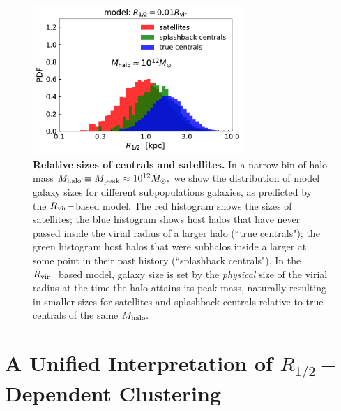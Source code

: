 \documentclass[usenatbib,usegraphicx,letterpaper]{mn2e}
\newcommand{\rhalf}{R_{1/2}}
\newcommand{\mpeak}{M_{\rm peak}}
\newcommand{\mhalo}{M_{\rm halo}}
\newcommand{\rvir}{R_{\rm vir}}
\newcommand{\msun}{M_\odot}
\begin{document}
\begin{figure}
\centering
\includegraphics[width=8cm]{FIGS/rvir_only_cen_sat_sizes.pdf}
\caption{
{\bf Relative sizes of centrals and satellites.}
In a narrow bin of halo mass $\mhalo\equiv\mpeak\approx10^{12}\msun,$ we show the distribution of model galaxy sizes for different subpopulations galaxies, as predicted by the $\rvir-$based model. The red histogram shows the sizes of satellites; the blue histogram shows host halos that have never passed inside the virial radius of a larger halo (``true centrals"); the green histogram host halos that were subhalos inside a larger at some point in their past history (``splashback centrals"). In the $\rvir-$based model, galaxy size is set by the {\em physical} size of the virial radius at the time the halo attains its peak mass, naturally resulting in smaller sizes for satellites and splashback centrals relative to true centrals of the same $\mhalo.$
}
\label{fig:censatsizehist}
\end{figure}


\section{A Unified Interpretation of $\rhalf-$Dependent Clustering}
\label{sec:interpretation}
\end{document}
